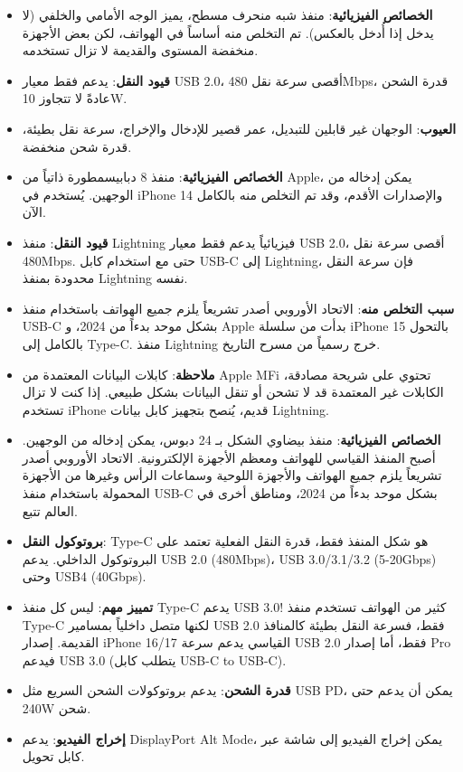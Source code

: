 
\begin{itemize}
  \item \textbf{الخصائص الفيزيائية}: منفذ شبه منحرف مسطح، يميز الوجه الأمامي والخلفي (لا يدخل إذا أُدخل بالعكس). تم التخلص منه أساساً في الهواتف، لكن بعض الأجهزة منخفضة المستوى والقديمة لا تزال تستخدمه.
  \item \textbf{قيود النقل}: يدعم فقط معيار USB 2.0، أقصى سرعة نقل 480Mbps، قدرة الشحن عادةً لا تتجاوز 10W.
  \item \textbf{العيوب}: الوجهان غير قابلين للتبديل، عمر قصير للإدخال والإخراج، سرعة نقل بطيئة، قدرة شحن منخفضة.
\end{itemize}


\begin{itemize}
  \item \textbf{الخصائص الفيزيائية}: منفذ 8 دبابيسمطورة ذاتياً من Apple، يمكن إدخاله من الوجهين. يُستخدم في iPhone 14 والإصدارات الأقدم، وقد تم التخلص منه بالكامل الآن.
  \item \textbf{قيود النقل}: منفذ Lightning فيزيائياً يدعم فقط معيار USB 2.0، أقصى سرعة نقل 480Mbps. حتى مع استخدام كابل USB-C إلى Lightning، فإن سرعة النقل محدودة بمنفذ Lightning نفسه.
  \item \textbf{سبب التخلص منه}: الاتحاد الأوروبي أصدر تشريعاً يلزم جميع الهواتف باستخدام منفذ USB-C بشكل موحد بدءاً من 2024، و Apple بدأت من سلسلة iPhone 15 بالتحول بالكامل إلى Type-C. منفذ Lightning خرج رسمياً من مسرح التاريخ.
  \item \textbf{ملاحظة}: كابلات البيانات المعتمدة من Apple MFi تحتوي على شريحة مصادقة، الكابلات غير المعتمدة قد لا تشحن أو تنقل البيانات بشكل طبيعي. إذا كنت لا تزال تستخدم iPhone قديم، يُنصح بتجهيز كابل بيانات Lightning.
\end{itemize}


\begin{itemize}
  \item \textbf{الخصائص الفيزيائية}: منفذ بيضاوي الشكل بـ 24 دبوس، يمكن إدخاله من الوجهين. أصبح المنفذ القياسي للهواتف ومعظم الأجهزة الإلكترونية. الاتحاد الأوروبي أصدر تشريعاً يلزم جميع الهواتف والأجهزة اللوحية وسماعات الرأس وغيرها من الأجهزة المحمولة باستخدام منفذ USB-C بشكل موحد بدءاً من 2024، ومناطق أخرى في العالم تتبع.
  \item \textbf{بروتوكول النقل}: Type-C هو شكل المنفذ فقط، قدرة النقل الفعلية تعتمد على البروتوكول الداخلي. يدعم USB 2.0 (480Mbps)، USB 3.0/3.1/3.2 (5-20Gbps) وحتى USB4 (40Gbps).
  \item \textbf{تمييز مهم}: ليس كل منفذ Type-C يدعم USB 3.0! كثير من الهواتف تستخدم منفذ Type-C لكنها متصل داخلياً بمسامير USB 2.0 فقط، فسرعة النقل بطيئة كالمنافذ القديمة. إصدار iPhone 16/17 القياسي يدعم سرعة USB 2.0 فقط، أما إصدار Pro فيدعم USB 3.0 (يتطلب كابل USB-C to USB-C).
  \item \textbf{قدرة الشحن}: يدعم بروتوكولات الشحن السريع مثل USB PD، يمكن أن يدعم حتى 240W شحن.
  \item \textbf{إخراج الفيديو}: يدعم DisplayPort Alt Mode، يمكن إخراج الفيديو إلى شاشة عبر كابل تحويل.
\end{itemize}

